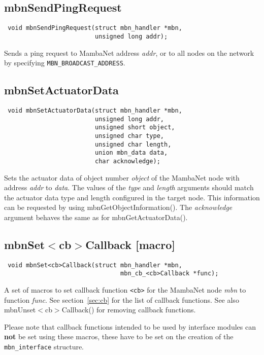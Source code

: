 \subsection{mbnSendPingRequest}
\begin{verbatim}
 void mbnSendPingRequest(struct mbn_handler *mbn,
                         unsigned long addr);
\end{verbatim}
Sends a ping request to MambaNet address \textit{addr}, or to all nodes on the network by specifying \verb|MBN_BROADCAST_ADDRESS|.


\subsection{mbnSetActuatorData}
\begin{verbatim}
 void mbnSetActuatorData(struct mbn_handler *mbn,
                         unsigned long addr,
                         unsigned short object,
                         unsigned char type,
                         unsigned char length,
                         union mbn_data data,
                         char acknowledge);
\end{verbatim}
Sets the actuator data of object number \textit{object} of the MambaNet node with address \textit{addr} to \textit{data}. The values of the \textit{type} and \textit{length} arguments should match the actuator data type and length configured in the target node. This information can be requested by using mbnGetObjectInformation(). The \textit{acknowledge} argument behaves the same as for mbnGetActuatorData().


\subsection{mbnSet$<$cb$>$Callback \footnotesize{[macro]}}
\begin{verbatim}
 void mbnSet<cb>Callback(struct mbn_handler *mbn,
                                mbn_cb_<cb>Callback *func);
\end{verbatim}
A set of macros to set callback function \verb|<cb>| for the MambaNet node \textit{mbn} to function \textit{func}. See section\ \ref{sec:cb} for the list of callback functions. See also mbnUnset$<$cb$>$Callback() for removing callback functions.

Please note that callback functions intended to be used by interface modules can \textbf{not} be set using these macros, these have to be set on the creation of the \verb|mbn_interface| structure.


